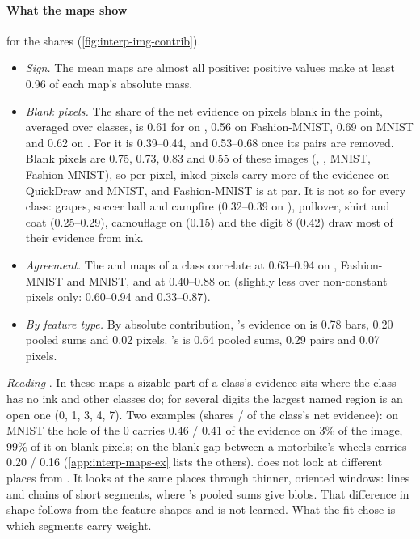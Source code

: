 \paragraph{What the maps show}  for the shares (\cref{fig:interp-img-contrib}).
\begin{itemize}
\item \emph{Sign.} The mean maps are almost all positive: positive values make at least 0.96 of each map's absolute mass.
\item \emph{Blank pixels.} The share of the net evidence on pixels blank in the point, averaged over classes, is 0.61 for  on , 0.56 on Fashion-MNIST, 0.69 on MNIST and 0.62 on . For  it is 0.39--0.44, and 0.53--0.68 once its pairs are removed. Blank pixels are 0.75, 0.73, 0.83 and 0.55 of these images (, , MNIST, Fashion-MNIST), so per pixel, inked pixels carry more of the evidence on QuickDraw and MNIST, and Fashion-MNIST is at par. It is not so for every class: grapes, soccer ball and campfire (0.32--0.39 on ), pullover, shirt and coat (0.25--0.29), camouflage on  (0.15) and the digit 8 (0.42) draw most of their evidence from ink.
\item \emph{Agreement.} The  and  maps of a class correlate at 0.63--0.94 on , Fashion-MNIST and MNIST, and at 0.40--0.88 on  (slightly less over non-constant pixels only: 0.60--0.94 and 0.33--0.87).
\item \emph{By feature type.} By absolute contribution, 's evidence on  is 0.78 bars, 0.20 pooled sums and 0.02 pixels. 's is 0.64 pooled sums, 0.29 pairs and 0.07 pixels.
\end{itemize}
\emph{Reading} . In these maps a sizable part of a class's evidence sits where the class has no ink and other classes do; for several digits the largest named region is an open one (0, 1, 3, 4, 7). Two examples (shares  /  of the class's net evidence): on MNIST the hole of the 0 carries 0.46 / 0.41 of the evidence on 3\% of the image, 99\% of it on blank pixels; on  the blank gap between a motorbike's wheels carries 0.20 / 0.16 (\cref{app:interp-maps-ex} lists the others).  does not look at different places from . It looks at the same places through thinner, oriented windows: lines and chains of short segments, where 's pooled sums give blobs. That difference in shape follows from the feature shapes and is not learned. What the fit chose is which segments carry weight.
